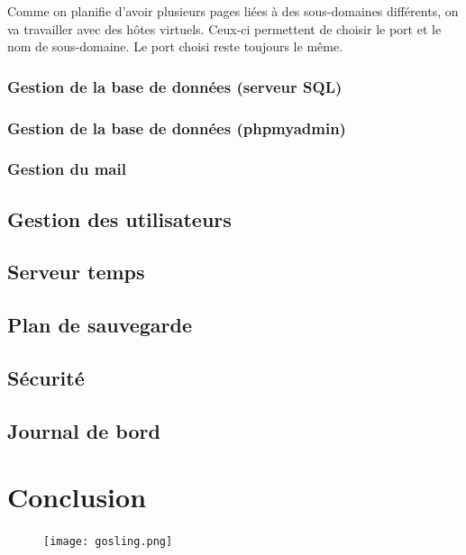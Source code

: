 \documentclass{article}
\begin{document}
Comme on planifie d'avoir plusieurs pages liées à des sous-domaines différents, on va travailler avec des hôtes virtuels. Ceux-ci permettent de choisir le port et le nom de sous-domaine. Le port choisi reste toujours le même.

\subsubsection{Gestion de la base de données (serveur SQL)}

\subsubsection{Gestion de la base de données (phpmyadmin)}

\subsubsection{Gestion du mail}

\subsection{Gestion des utilisateurs}



\subsection{Serveur temps}
\subsection{Plan de sauvegarde}
\subsection{Sécurité}
\subsection{Journal de bord}

\pagebreak

	\newpage
	\section{Conclusion}


	\begin{figure}[h]
		\centering
		\texttt{[image: gosling.png]}
		
		\label{fig:gosling}
	\end{figure}
	
\end{document}

